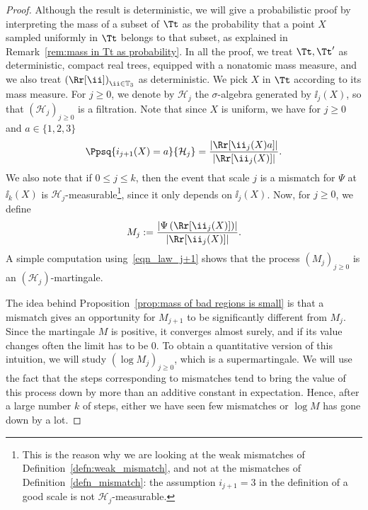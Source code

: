 \begin{proof}
Although the result is deterministic, we will give a probabilistic proof
by interpreting the mass of a subset of $\Tt$ as the probability that a point $X$ sampled uniformly in $\Tt$ belongs to that subset, as explained in Remark~\ref{rem:mass in Tt as probability}.
In all the proof, we treat $\Tt, \Tt'$ as deterministic, compact real trees, equipped with a nonatomic mass measure, and we also treat $\left( \Rr[\ii] \right)_{\ii \in \mathbb{T}_3}$ as deterministic.
We pick $X$ in $\Tt$ according to its mass measure.
For $j \geq 0$, we denote by $\mathcal{H}_j$ the $\sigma$-algebra generated by $\ii_j(X)$, so that $(\mathcal H_j)_{j\geq 0}$ is a filtration.
Note that since $X$ is uniform, we have for $j \geq 0$ and $a \in \{1,2,3\}$\vspace*{-3pt}
\begin{equation}\label{eqn_law_j+1}
\Ppsq{i_{j+1}(X)=a}{\mathcal H_j} = \frac{\left| \Rr[\ii_j(X) a] \right|}{\left| \Rr[\ii_j(X)] \right|}.
\end{equation}
We also note that if $0 \leq j \leq k$, then the event that scale $j$ is a mismatch for $\Psi$ at $\ii_k(X)$ is $\mathcal{H}_j$-measurable\footnote{This is the reason why we are looking at the weak mismatches of Definition~\ref{defn:weak_mismatch}, and not at the mismatches of Definition~\ref{defn_mismatch}: the assumption $i_{j+1}=3$ in the definition of a good scale is not $\mathcal{H}_j$-measurable.}, since it only depends on $\ii_j(X)$.
Now, for $j \geq 0$, we define
\begin{equation}\label{eqn:martingale}
M_j:=\frac{\left| \Psi \left( \Rr[\ii_j(X)] \right) \right|}{\left| \Rr[\ii_j(X)] \right|}.
\end{equation}
A simple computation using~\eqref{eqn_law_j+1} shows that the process $(M_j)_{j \geq 0}$ is an $(\mathcal H_j)$\nobreakdash-mar\-tingale.

The idea behind Proposition~\ref{prop:mass of bad regions is small} is that a mismatch gives an opportunity for $M_{j+1}$ to be significantly different from $M_j$. Since the martingale $M$ is positive, it converges almost surely, and if its value changes often the limit has to be $0$.
To obtain a quantitative version of this intuition, we will study $(\log M_j)_{j \geq 0}$, which is a supermartingale. We will use the fact that the steps corresponding to mismatches tend to bring the value of this process down by more than an additive constant in expectation. Hence, after a large number $k$ of steps, either we have seen few mismatches or $\log M$ has gone down by a lot.


\end{proof}

